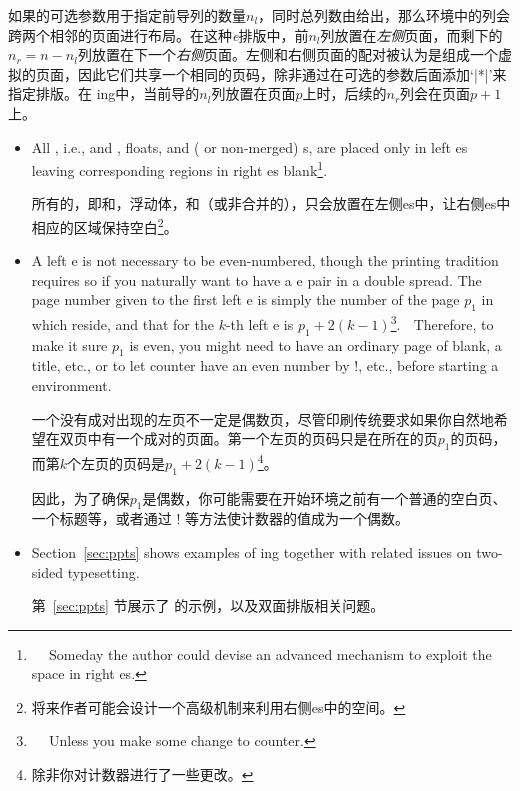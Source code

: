 \begin{description}
如果\beginparacol{}的可选参数用于指定前导列的数量$n_l$，同时总列数由给出，那么环境中的列会跨两个相邻的页面进行布局。在这种{\em\Uidx\parapag{}e}排版中，前$n_l$列放置在{\em 左侧}页面，而剩下的$n_r=n-n_l$列放置在下一个{\em 右侧}页面。左侧和右侧页面的配对被认为是组成一个虚拟的{\em\Uidx\paired}页面，因此它们共享一个相同的页码，除非通过在可选的参数后面添加`|*|'来指定{\em\Uidx\npaired}排版。在\npaired{} \parapag{}ing中，当前导的$n_l$列放置在页面$p$上时，后续的$n_r$列会在页面$p+1$上。

\begin{itemize}
\item
All {\em\Uidx\pwstuff}, i.e., \Preenv{} and \postenv, \pwise{} floats,
\mctext{} and (\mgfnote{} or non-merged) \Scfnote{}s, are placed only in
left \parapag{}es leaving corresponding regions in right \parapag{}es
blank\footnote{

Someday the author could devise an advanced mechanism to exploit the space
in right \parapag{}es.}.

所有的{\em\Uidx\pwstuff}，即\Preenv{}和\postenv，\pwise{}浮动体，\mctext{}和（\mgfnote{}或非合并的）\Scfnote{}，只会放置在左侧\parapag{}es中，让右侧\parapag{}es中相应的区域保持空白\footnote{将来作者可能会设计一个高级机制来利用右侧\parapag{}es中的空间。}。
\item
A \npaired{} left \parapag{}e is not necessary to be even-numbered, though
the printing tradition requires so if you naturally want to have a
\parapag{}e pair in a double spread.  The page number given to the first
left \parapag{}e is simply the number of the page $p_1$ in which
\beginparacol{} reside, and that for the $k$-th left \parapag{}e is
$p_1+2(k-1)$\footnote{

Unless you make some change to  counter.}.

Therefore, to make it sure $p_1$ is even, you might need to have an
ordinary page of blank, a title, etc., or to let  counter have
an even number by \!\setcounter!, etc., before starting a 
environment.

一个没有成对出现的左页不一定是偶数页，尽管印刷传统要求如果你自然地希望在双页中有一个成对的页面。第一个左页的页码只是在\beginparacol{}所在的页$p_1$的页码，而第$k$个左页的页码是$p_1+2(k-1)$\footnote{除非你对计数器进行了一些更改。}。

因此，为了确保$p_1$是偶数，你可能需要在开始环境之前有一个普通的空白页、一个标题等，或者通过 \!\setcounter! 等方法使计数器的值成为一个偶数。

\item
Section~\ref{sec:ppts} shows examples of \parapag{}ing together with
related issues on two-sided typesetting.

第~\ref{sec:ppts} 节展示了 \parapag{} 的示例，以及双面排版相关问题。
\end{itemize}
\end{description}
